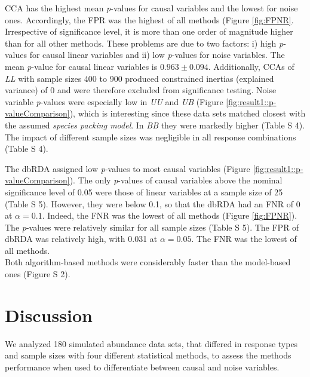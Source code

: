 \documentclass[a4paper,11pt]{article}
\begin{document}
    


		CCA has the highest mean \textit{p}-values for causal variables and the lowest for noise ones. 
		Accordingly, the FPR was the highest of all methods (Figure \ref{fig:FPNR}.
		Irrespective of significance level, it is more than one order of magnitude higher than for all other methods.
		These problems are due to two factors: i) high \textit{p}-values for causal linear variables and ii) low \textit{p}-values for noise variables. 
		The mean \textit{p}-value for causal linear variables is $0.963\pm0.094$. 
        Additionally, CCAs of \textit{LL} with sample sizes 400 to 900 produced constrained inertias (explained variance) of 0 and were therefore excluded from significance testing. 
		Noise variable \textit{p}-values were especially low in \textit{UU} and \textit{UB} (Figure \ref{fig:result1::p-valueComparison}), which is interesting since these data sets matched closest with the assumed \textit{species packing model}.  
		In \textit{BB} they were markedly higher (Table S 4). 
        The impact of different sample sizes was negligible in all response combinations (Table S 4).   


		The dbRDA assigned low \textit{p}-values to most causal variables (Figure \ref{fig:result1::p-valueComparison}).
		The only \textit{p}-values of causal variables above the nominal significance level of 0.05 were those of linear variables at a sample size of 25 (Table S 5).
		However, they were below 0.1, so that the dbRDA had an FNR of 0 at $\alpha = 0.1$.  
		Indeed, the FNR was the lowest of all methods (Figure \ref{fig:FPNR}).
        The \textit{p}-values were relatively similar for all sample sizes (Table S 5). 
        The FPR of dbRDA was relatively high, with 0.031 at $\alpha = 0.05$.  
        The FNR was the lowest of all methods. \\
        Both algorithm-based methods were considerably faster than the model-based ones (Figure S 2).

\section{Discussion}
	We analyzed 180 simulated abundance data sets, that differed in response types and sample sizes with four different statistical methods, to assess the methods performance when used to differentiate between causal and noise variables. 
	
\end{document}
